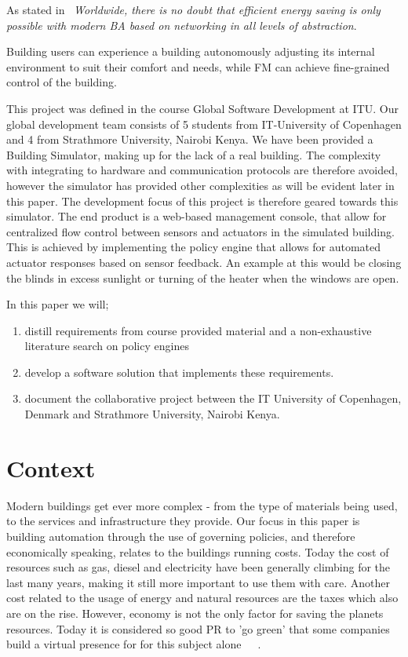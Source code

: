 As stated in~\cite{ba-short} \textit{Worldwide, there is no doubt that efficient energy saving is only possible with modern BA based on networking in all levels of abstraction}.

Building users can experience a building autonomously adjusting its internal environment to suit their comfort and needs, while FM can achieve fine-grained control of the building.

This project was defined in the course Global Software Development at ITU. Our global development team consists of 5 students from IT-University of Copenhagen and 4 from Strathmore University, Nairobi Kenya. We have been provided a Building Simulator, making up for the lack of a real building. The complexity with integrating to hardware and communication protocols are therefore avoided, however the simulator has provided other complexities as will be evident later in this paper. The development focus of this project is therefore geared towards this simulator. The end product is a web-based management console, that allow for centralized flow control between sensors and actuators in the simulated building. This is achieved by implementing the policy engine that allows for automated actuator responses based on sensor feedback. An example at this would be closing the blinds in excess sunlight or turning of the heater when the windows are open.

In this paper we will; 
\begin{enumerate}
	\item distill requirements from course provided material and a non-exhaustive literature search on policy engines
	\item develop a software solution that implements these requirements.
	\item document the collaborative project between the IT University of Copenhagen, Denmark and Strathmore University, Nairobi Kenya.
\end{enumerate}

\section{Context}
Modern buildings get ever more complex - from the type of materials being used, to the services and infrastructure they provide. Our focus in this paper is building automation through the use of governing policies, and therefore economically speaking, relates to the buildings running costs. Today the cost of resources such as gas, diesel and electricity have been generally climbing for the last many years, making it still more important to use them with care. Another cost related to the usage of energy and natural resources are the taxes which also are on the rise. However, economy is not the only factor for saving the planets resources. Today it is considered so good PR to 'go green' that some companies build a virtual presence for for this subject alone~\cite{green-google}~\cite{green-facebook}~\cite{green-microsoft}.

